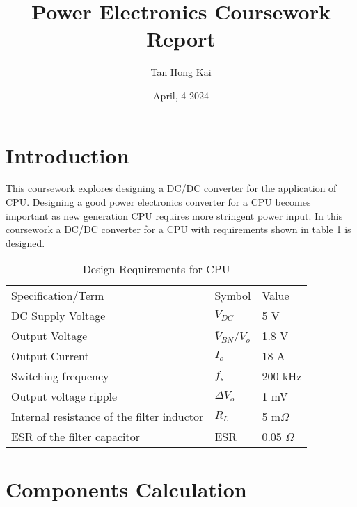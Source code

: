 \documentclass{article}
\title{Power Electronics Coursework Report}
\author{Tan Hong Kai}
\date{April, 4 2024}
\begin{document}
\maketitle

\section{Introduction}

This coursework explores designing a DC/DC converter for the application of CPU.
Designing a good power electronics converter for a CPU becomes important as new generation CPU requires more stringent power input.
In this coursework a DC/DC converter for a CPU with requirements shown in table \ref{tab:cpu-requirement} is designed.

\begin{table}
    \label{tab:cpu-requirement}
    \caption[Design Requirements]{Design Requirements for CPU}
    \centering
    \begin{tabular}{| l | l | l |}
        Specification/Term & Symbol & Value\\
        DC Supply Voltage & $V_{DC}$ & 5 V\\
        Output Voltage & $\bar{V}_{BN}$/$V_{o}$ & 1.8 V\\
        Output Current & $I_{o}$ & 18 A\\
        Switching frequency & $f_s$ & 200 kHz\\
Output voltage ripple & $\Delta{}V_o$ & 1 mV\\
Internal resistance of the filter inductor & $R_L$ & 5 m$\Omega$\\
ESR of the filter capacitor & ESR & 0.05 $\Omega$
    \end{tabular}
\end{table}

\section{Components Calculation}
\end{document}
